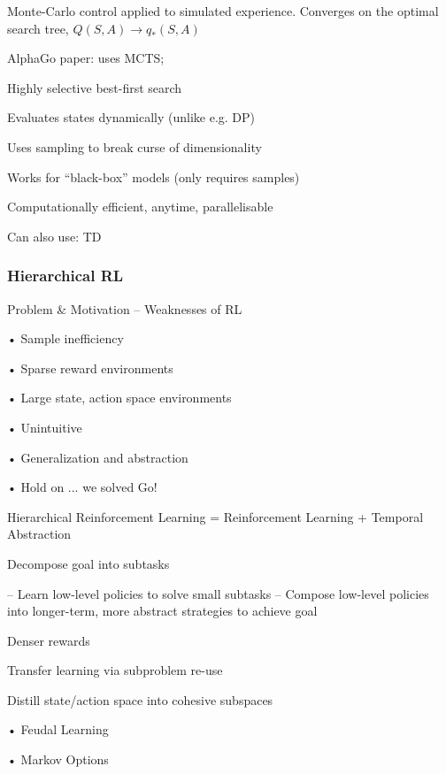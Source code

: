 \documentclass[english]{article}
\begin{document}
Monte-Carlo control applied to simulated experience. Converges on the optimal search tree, $Q(S,A) \to q_*(S,A)$




\item AlphaGo paper: uses MCTS; 

\benum 
\item 
Highly selective best-first search
\item 
Evaluates states dynamically (unlike e.g. DP)
\item 
Uses sampling to break curse of dimensionality
\item 
Works for “black-box” models (only requires samples)
\item 
Computationally efficient, anytime, parallelisable
\eenum 

Can also use: TD

\eenum




\subsubsection{Hierarchical RL}
\benum

\item Problem \& Motivation – Weaknesses of RL

•  Sample inefficiency

• Sparse reward
environments

• Large state, action space
environments

• Unintuitive

• Generalization and
abstraction

• Hold on ... we solved Go!

\item Hierarchical
Reinforcement Learning = 
Reinforcement Learning
+
Temporal
Abstraction

Decompose goal into subtasks

– Learn low-level policies to solve small subtasks
– Compose low-level policies into longer-term, more abstract
strategies to achieve goal
\benum 
\item  Denser rewards
\item  Transfer learning via subproblem re-use
\item  Distill state/action space into cohesive subspaces

\eenum

\item  
• Feudal Learning

• Markov Options
\end{document}
